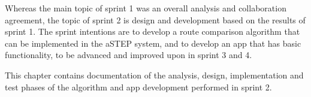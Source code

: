 Whereas the main topic of sprint 1 was an overall analysis and collaboration agreement, the topic of sprint 2 is design and development based on the results of sprint 1. The sprint intentions are to develop a route comparison algorithm that can be implemented in the aSTEP system, and to develop an app that has basic functionality, to be advanced and improved upon in sprint 3 and 4.

This chapter contains documentation of the analysis, design, implementation and test phases of the algorithm and app development performed in sprint 2.